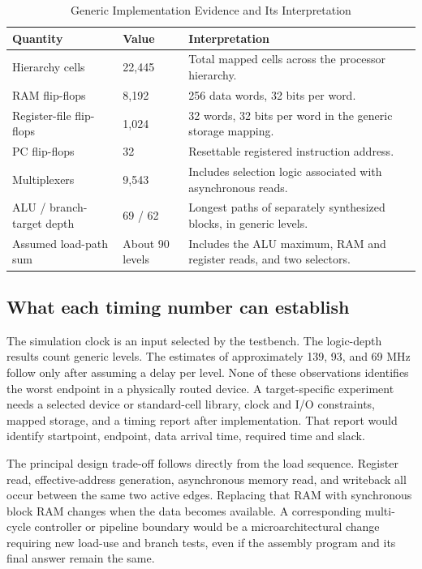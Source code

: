 \documentclass[conference,letterpaper]{IEEEtran}
\begin{document}
\begin{table}[!ht]\centering
\caption{Generic Implementation Evidence and Its Interpretation}
\begin{tabularx}{.98\linewidth}{@{}llY@{}}\toprule
Quantity & Value & Interpretation\\\midrule
Hierarchy cells & 22,445 & Total mapped cells across the processor hierarchy.\\
RAM flip-flops & 8,192 & 256 data words, 32 bits per word.\\
Register-file flip-flops & 1,024 & 32 words, 32 bits per word in the generic storage mapping.\\
PC flip-flops & 32 & Resettable registered instruction address.\\
Multiplexers & 9,543 & Includes selection logic associated with asynchronous reads.\\
ALU / branch-target depth & 69 / 62 & Longest paths of separately synthesized blocks, in generic levels.\\
Assumed load-path sum & About 90 levels & Includes the ALU maximum, RAM and register reads, and two selectors.\\\bottomrule
\end{tabularx}\end{table}

\subsection{What each timing number can establish}
The simulation clock is an input selected by the testbench. The logic-depth results count generic levels. The estimates of approximately 139, 93, and 69 MHz follow only after assuming a delay per level. None of these observations identifies the worst endpoint in a physically routed device. A target-specific experiment needs a selected device or standard-cell library, clock and I/O constraints, mapped storage, and a timing report after implementation. That report would identify startpoint, endpoint, data arrival time, required time and slack.

The principal design trade-off follows directly from the load sequence. Register read, effective-address generation, asynchronous memory read, and writeback all occur between the same two active edges. Replacing that RAM with synchronous block RAM changes when the data becomes available. A corresponding multi-cycle controller or pipeline boundary would be a microarchitectural change requiring new load-use and branch tests, even if the assembly program and its final answer remain the same.
\end{document}
